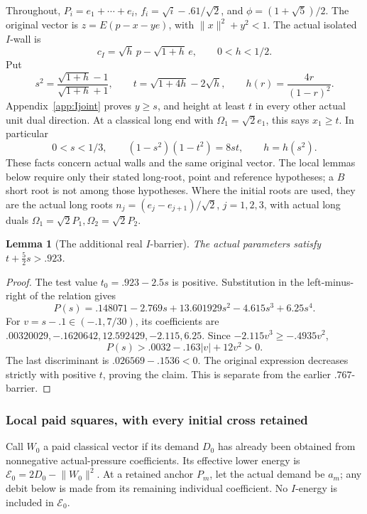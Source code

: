 \documentclass[11pt]{article}
\newtheorem{lemma}[theorem]{Lemma}
\theoremstyle{definition}
\theoremstyle{remark}
\newcommand{\norm}[1]{\lVert #1\rVert}
\begin{document}
Throughout, \(P_i=e_1+\cdots+e_i\),
\(f_i=\sqrt i-.61/\sqrt2\), and \(\phi=(1+\sqrt5)/2\).
The original vector is \(z=E(p-x-ye)\), with
\(\norm x^2+y^2<1\). The actual isolated \(I\)-wall is
\[
 c_I=\sqrt h\,p-\sqrt{1+h}\,e,\qquad 0<h<1/2.
\]
Put
\[
 s^2={\frac{\sqrt{1+h}-1}{\sqrt{1+h}+1}},\qquad
 t=\sqrt{1+4h}-2\sqrt h,\qquad h(r)={\frac{4r}{(1-r)^2}}.
\]
Appendix~\ref{app:Ijoint} proves \(y\ge s\), and height at least
\(t\) in every other actual unit dual direction. At a classical long
end with \(\Omega_1=\sqrt2e_1\), this says \(x_1\ge t\).
In particular
\[
 0<s<1/3,\qquad (1-s^2)(1-t^2)=8st,\qquad h=h(s^2).
\]
These facts concern actual walls and the same original vector.
The local lemmas below require only their stated long-root, point and
reference hypotheses; a \(B\) short root is not among those hypotheses.
Where the initial roots are used, they are the actual long roots
\(n_j=(e_j-e_{j+1})/\sqrt2\), \(j=1,2,3\), with actual
long duals \(\Omega_1=\sqrt2P_1,\Omega_2=\sqrt2P_2\).

\begin{lemma}[The additional real \(I\)-barrier]
\label{lem:I923-real-barrier}
The actual parameters satisfy \(t+\tfrac52s>.923\).
\end{lemma}
\begin{proof}
The test value \(t_0=.923-2.5s\) is positive. Substitution in the
left-minus-right of the relation gives
\[
 P(s)=.148071-2.769s+13.601929s^2-4.615s^3+6.25s^4.
\]
For \(v=s-.1\in(-.1,7/30)\), its coefficients are
\(.00320029,-.1620642,12.592429,-2.115,6.25\).
Since \(-2.115v^3\ge-.4935v^2\),
\[
 P(s)>.0032-.163|v|+12v^2>0.
\]
The last discriminant is \(.026569-.1536<0\). The original
expression decreases strictly with positive \(t\), proving the claim.
This is separate from the earlier \(.767\)-barrier.
\end{proof}

\subsubsection{Local paid squares, with every initial cross retained}
Call \(W_0\) a paid classical vector if its demand \(D_0\) has already
been obtained from nonnegative actual-pressure coefficients. Its effective
lower energy is \(\mathcal E_0=2D_0-\norm{W_0}^2\).
At a retained anchor \(P_m\), let the actual demand be \(a_m\);
any debit below is made from its remaining individual coefficient.
No \(I\)-energy is included in \(\mathcal E_0\).
\end{document}
